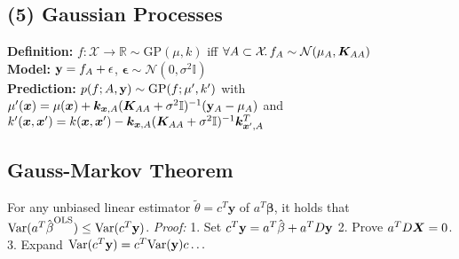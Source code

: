 \subsection*{(5) Gaussian Processes}
\textbf{Definition:} $f: \mathcal{X} \rightarrow \mathbb{R} \sim \mathrm{GP}(\mu, k)$ iff $\forall A \subset \mathcal{X}\!.\, f_A \sim \mathcal{N}(\mu_A, {\bm{K}}_{AA})$\\
\textbf{Model:} 
${\mathbf{y}} = f_A + \mathbf{\epsilon}$, $\mathbf{\epsilon} \sim \mathcal{N}(0, \sigma^2\mathbb{I})$\\
\textbf{Prediction:}
$p(f;A,{\mathbf{y}}) \sim \mathrm{GP}(f;\mu', k')$ with
$\mu'({\bm{x}})=\mu({\bm{x}})+{\bm{k}}_{{\bm{x}},A}({\bm{K}}_{AA}+\sigma^2\mathbb{I})^{-1}({\mathbf{y}}_A-\mu_A)$ and 
$k'({\bm{x}},{\bm{x}}') = k({\bm{x}},{\bm{x}}') - {\bm{k}}_{{\bm{x}},A}({\bm{K}}_{AA}+\sigma^2\mathbb{I})^{-1}{\bm{k}}^T_{{\bm{x}}',A}$

\subsection*{Gauss-Markov Theorem}
For any unbiased linear estimator $\tilde{\theta} = c^T\mathbf{y}$ of $a^T\mathbf{\beta}$, it holds that $\mathrm{Var}(a^T\hat{\kern0pt \beta}^{\mathrm{OLS}}) \leq \mathrm{Var}(c^T\mathbf{y})$. \emph{Proof:} 1. Set $c^T{\mathbf{y}} = a^T\hat{\kern0pt \beta}+a^TD{\mathbf{y}}$ 2. Prove $a^TD{\bm{X}}=0$. 3. Expand $\mathrm{Var}(c^T{\mathbf{y}})=c^T\mathrm{Var}({\mathbf{y}})c\ldots$

